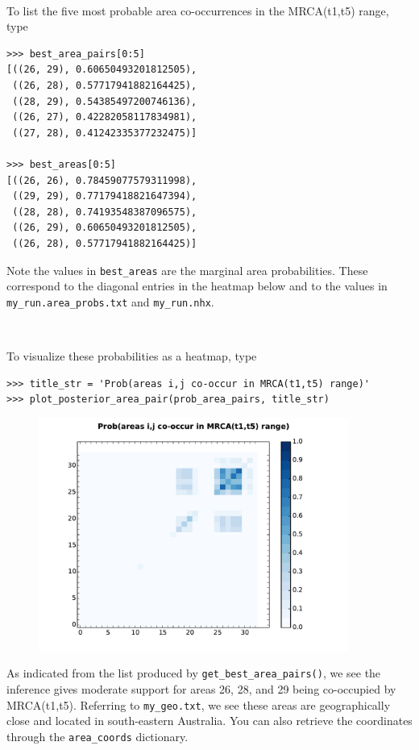\documentclass[11pt]{article}
\newcommand{\impmark}{\strut\vadjust{\domark}}
\newcommand{\domark}{%
  \vbox to 0pt{
    \kern-\dp\strutbox
    \smash{\llap{$\rightarrow$\kern1em}}
    \vss
  }%
}
\begin{document}
\noindent \\ \impmark To list the five most probable area co-occurrences in the MRCA(t1,t5) range, type
\begin{framed}
\begin{lstlisting}
>>> best_area_pairs[0:5]
[((26, 29), 0.60650493201812505),
 ((26, 28), 0.57717941882164425),
 ((28, 29), 0.54385497200746136),
 ((26, 27), 0.42282058117834981),
 ((27, 28), 0.41242335377232475)]
 
>>> best_areas[0:5]
[((26, 26), 0.78459077579311998),
 ((29, 29), 0.77179418821647394),
 ((28, 28), 0.74193548387096575),
 ((26, 29), 0.60650493201812505),
 ((26, 28), 0.57717941882164425)]

\end{lstlisting}
\end{framed}

Note the values in \texttt{best\_areas} are the marginal area probabilities.
These correspond to the diagonal entries in the heatmap below and to the values in \texttt{my\_run.area\_probs.txt} and \texttt{my\_run.nhx}.

\noindent \\ \impmark To visualize these probabilities as a heatmap, type
\begin{framed}
\begin{lstlisting}
>>> title_str = 'Prob(areas i,j co-occur in MRCA(t1,t5) range)'
>>> plot_posterior_area_pair(prob_area_pairs, title_str)
\end{lstlisting}
\end{framed}

\begin{figure}[H]
\centering
\includegraphics[width=4in]{figures/range_area_pair_pp}
\end{figure}

As indicated from the list produced by \texttt{get\_best\_area\_pairs()}, we see the inference gives moderate support for areas 26, 28, and 29 being co-occupied by MRCA(t1,t5).
Referring to \texttt{my\_geo.txt}, we see these areas are geographically close and located in south-eastern Australia.
You can also retrieve the coordinates through the \texttt{area\_coords} dictionary.
\end{document}
